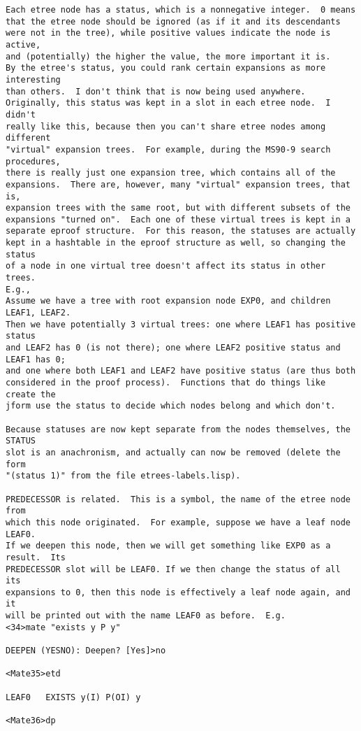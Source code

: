 \begin{verbatim}
Each etree node has a status, which is a nonnegative integer.  0 means
that the etree node should be ignored (as if it and its descendants
were not in the tree), while positive values indicate the node is active,
and (potentially) the higher the value, the more important it is.  
By the etree's status, you could rank certain expansions as more interesting
than others.  I don't think that is now being used anywhere.
Originally, this status was kept in a slot in each etree node.  I didn't 
really like this, because then you can't share etree nodes among different
"virtual" expansion trees.  For example, during the MS90-9 search procedures,
there is really just one expansion tree, which contains all of the 
expansions.  There are, however, many "virtual" expansion trees, that is,
expansion trees with the same root, but with different subsets of the
expansions "turned on".  Each one of these virtual trees is kept in a
separate eproof structure.  For this reason, the statuses are actually
kept in a hashtable in the eproof structure as well, so changing the status
of a node in one virtual tree doesn't affect its status in other trees. 
E.g.,
Assume we have a tree with root expansion node EXP0, and children LEAF1, LEAF2.
Then we have potentially 3 virtual trees: one where LEAF1 has positive status
and LEAF2 has 0 (is not there); one where LEAF2 positive status and LEAF1 has 0;
and one where both LEAF1 and LEAF2 have positive status (are thus both
considered in the proof process).  Functions that do things like create the
jform use the status to decide which nodes belong and which don't.

Because statuses are now kept separate from the nodes themselves, the STATUS 
slot is an anachronism, and actually can now be removed (delete the form
"(status 1)" from the file etrees-labels.lisp).

PREDECESSOR is related.  This is a symbol, the name of the etree node from
which this node originated.  For example, suppose we have a leaf node LEAF0.
If we deepen this node, then we will get something like EXP0 as a result.  Its
PREDECESSOR slot will be LEAF0. If we then change the status of all its 
expansions to 0, then this node is effectively a leaf node again, and it 
will be printed out with the name LEAF0 as before.  E.g.
<34>mate "exists y P y" 

DEEPEN (YESNO): Deepen? [Yes]>no

<Mate35>etd

LEAF0   EXISTS y(I) P(OI) y

<Mate36>dp


\end{verbatim}

